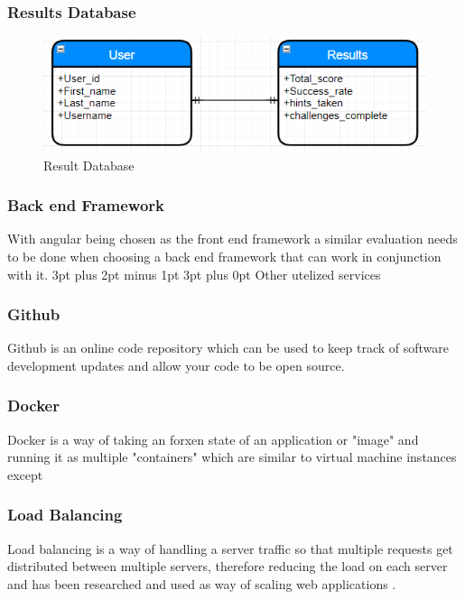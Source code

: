 \documentclass[12pt,a4paper]{article}
\makeatletter
\renewcommand\subsection{\@startsection {subsection}{1}{2mm} %
                               {3pt plus 2pt minus 1pt} %
                               {3pt plus 0pt} %
                               {\normalfont\bfseries}}
\makeatother
\begin{document}
\subsubsection{Results Database}  

\begin{figure}[h]
    \centering
    \includegraphics[width=1.0\textwidth]{Figs/Result_Db.PNG} 
    \caption{Result Database} 
    \label{ResultsDB}
\end{figure} 

\subsubsection{Back end Framework} 
With angular being chosen as the front end framework a similar evaluation needs to be done when choosing a back end framework that can work in conjunction with it.
\subsection{Other utelized services} 
\subsubsection{Github}  
Github is an online code repository which can be used to keep track of software development updates and allow your code to be open source. 
\subsubsection{Docker}  
Docker is a way of taking an forxen state of an application or "image" and running it as multiple "containers" which are similar to virtual machine instances except  
\subsubsection{Load Balancing} 
Load balancing is a way of handling a server traffic so that multiple requests get distributed between multiple servers, therefore reducing the load on each server and has been researched and used as way of scaling web applications \cite{chieu2009dynamic}.
\end{document}
